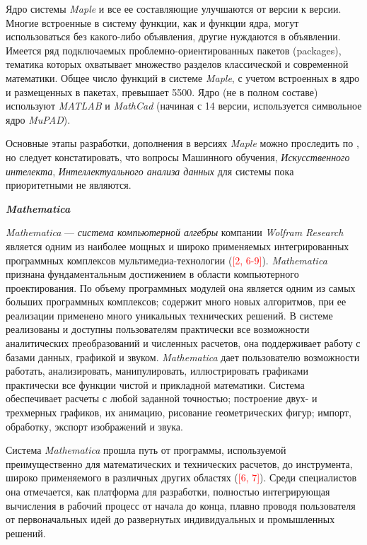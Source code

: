 Ядро системы \textit{Maple} и все ее составляющие улучшаются от версии к версии. Многие встроенные в систему функции, как и функции ядра, могут использоваться без какого-либо объявления, другие нуждаются в объявлении. Имеется ряд подключаемых проблемно-ориентированных пакетов (packages), тематика которых охватывает множество разделов классической и современной математики. Общее число функций в системе \textit{Maple}, с учетом встроенных в ядро и размещенных в пакетах, превышает 5500. Ядро (не в полном составе) используют \textit{MATLAB} и \textit{MathCad} (начиная с 14 версии, используется символьное ядро \textit{MuPAD}).

Основные этапы разработки, дополнения в версиях \textit{Maple} можно проследить по , но следует констатировать, что вопросы \textit{}Машинного обучения, \textit{Искусственного интелекта}, \textit{Интеллектуального анализа данных} для системы пока приоритетными не являются.

\textbf{\textit{Mathematica}}

\textit{Mathematica} --- \textit{система компьютерной алгебры} компании \textit{Wolfram Research} является одним из наиболее мощных и широко применяемых интегрированных программных комплексов мультимедиа-технологии (\textcolor{red}{[2, 6-9]}). \textit{Mathematica} признана фундаментальным достижением в области компьютерного проектирования. По объему программных модулей она является одним из самых больших программных комплексов; содержит много новых алгоритмов, при ее реализации применено много уникальных технических решений. В системе реализованы и доступны пользователям практически все возможности аналитических преобразований и численных расчетов, она поддерживает работу с базами данных, графикой и звуком. \textit{Mathematica} дает пользователю возможности работать, анализировать, манипулировать, иллюстрировать графиками практически все функции чистой и прикладной математики. Система обеспечивает расчеты с любой заданной точностью; построение двух- и трехмерных графиков, их анимацию, рисование геометрических фигур; импорт, обработку, экспорт изображений и звука.

Система \textit{Mathematica} прошла путь от программы, используемой преимущественно для математических и технических расчетов, до инструмента, широко применяемого в различных других областях (\textcolor{red}{[6, 7]}). Среди специалистов она отмечается, как платформа для разработки, полностью интегрирующая вычисления в рабочий процесс от начала до конца, плавно проводя пользователя от первоначальных идей до развернутых индивидуальных и промышленных решений.

